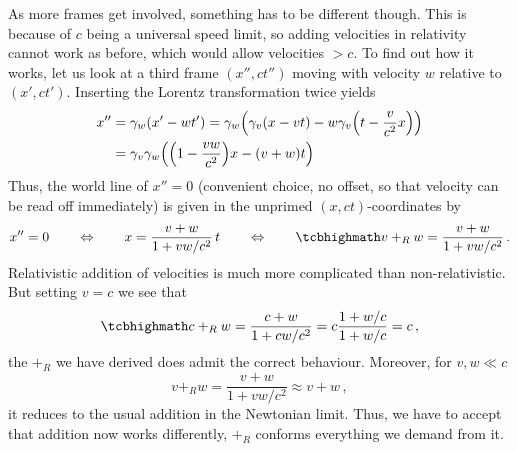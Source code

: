 As more frames get involved, something has to be different though. This is because of $c$ being a universal speed limit, so adding velocities in relativity cannot work as before, which would allow velocities $> c$. To find out how it works, let us look at a third frame $(x'', c t'')$ moving with velocity $w$ relative to $(x', c t')$. Inserting the Lorentz transformation twice yields
\begin{align*}
%
	x'' &= \gamma_w \qty(x' - w t') = \gamma_w \qty(\gamma_v (x - v t) - w \gamma_v \qty(t - \frac{v}{c^2} x))
	\notag\\
	&= \gamma_v \gamma_w \qty(\qty(1 - \frac{v w}{c^2}) x - (v + w) t)
\end{align*}
Thus, the world line of $x'' = 0$ (convenient choice, no offset, so that velocity can be read off immediately) is given in the unprimed $(x, ct)$-coordinates by
\begin{equation}\label{eq:velocity_addition_parallel}
	x'' = 0
	\qquad \Leftrightarrow \qquad
	x = \frac{v + w}{1 + v w / c^2} \, t
	\qquad \Leftrightarrow \qquad
	\eqbox{
	v +_R w = \frac{v + w}{1 + v w / c^2}
	} \, .
\end{equation}
Relativistic addition of velocities is much more complicated than non-relativistic. But setting $v = c$ we see that
\begin{equation}
	\eqbox{
	c +_R w = \frac{c + w}{1 + c w / c^2} = c \frac{1 + w / c}{1 + w / c} = c
	} \, ,
\end{equation}
the $+_R$ we have derived does admit the correct behaviour. Moreover, for $v, w \ll c$
\begin{equation}\label{eq:velocity_addition_limit}
	v +_R w = \frac{v + w}{1 + v w / c^2} \approx v + w \, ,
\end{equation}
it reduces to the usual addition in the Newtonian limit. Thus, we have to accept that addition now works differently, $+_R$ conforms everything we demand from it.\\


